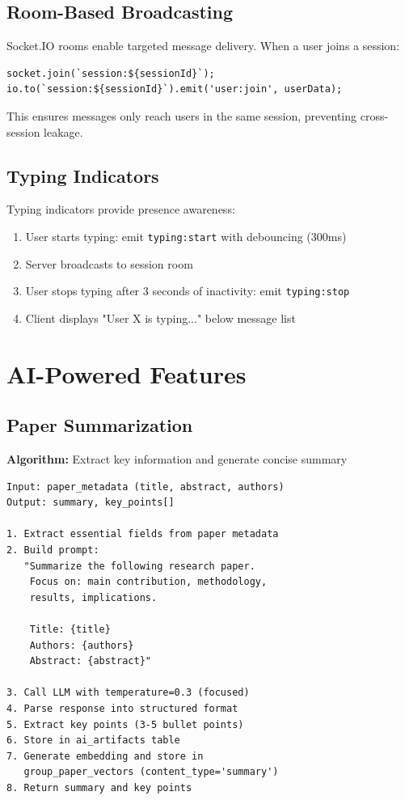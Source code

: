 \documentclass[12pt]{report}
\begin{document}
\subsection{Room-Based Broadcasting}

Socket.IO rooms enable targeted message delivery. When a user joins a session:

\begin{verbatim}
socket.join(`session:${sessionId}`);
io.to(`session:${sessionId}`).emit('user:join', userData);
\end{verbatim}

This ensures messages only reach users in the same session, preventing cross-session leakage.

\subsection{Typing Indicators}

Typing indicators provide presence awareness:

\begin{enumerate}
    \item User starts typing: emit \texttt{typing:start} with debouncing (300ms)
    \item Server broadcasts to session room
    \item User stops typing after 3 seconds of inactivity: emit \texttt{typing:stop}
    \item Client displays "User X is typing..." below message list
\end{enumerate}

\section{AI-Powered Features}

\subsection{Paper Summarization}

\textbf{Algorithm:} Extract key information and generate concise summary

\begin{verbatim}
Input: paper_metadata (title, abstract, authors)
Output: summary, key_points[]

1. Extract essential fields from paper metadata
2. Build prompt:
   "Summarize the following research paper.
    Focus on: main contribution, methodology, 
    results, implications.
    
    Title: {title}
    Authors: {authors}
    Abstract: {abstract}"
    
3. Call LLM with temperature=0.3 (focused)
4. Parse response into structured format
5. Extract key points (3-5 bullet points)
6. Store in ai_artifacts table
7. Generate embedding and store in 
   group_paper_vectors (content_type='summary')
8. Return summary and key points
\end{verbatim}
\end{document}
